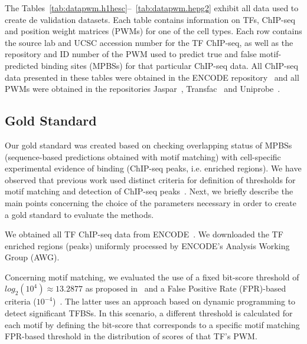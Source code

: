\documentclass{bioinfo}
\begin{document}
The Tables~\ref{tab:datapwm.h1hesc}--~\ref{tab:datapwm.hepg2} exhibit all
data used to create de validation datasets. Each table contains information
on TFs, ChIP-seq and position weight matrices (PWMs) for one of the cell types. Each
row contains the source lab and UCSC accession number for the TF ChIP-seq, as well
as the repository and ID number of the PWM used to predict true and false
motif-predicted binding sites (MPBSs) for that particular ChIP-seq data. All
ChIP-seq data presented in these tables were obtained in the ENCODE
repository~\citep{encode2012} and all PWMs were obtained in the repositories
Jaspar~\citep{mathelier2014}, Transfac~\citep{matys2006} and Uniprobe~\citep{robasky2011}.

\subsection{Gold Standard}
\label{sec:tfbs.reduction}

Our gold standard was created based on checking overlapping status
of MPBSs (sequence-based predictions obtained with motif matching)
with cell-specific experimental evidence of binding (ChIP-seq peaks,
i.e. enriched regions). We have observed that previous work used distinct
criteria for definition of thresholds for motif matching and detection of
ChIP-seq peaks~\citep{pique2011,boyle2011,cuellar2012,whitington2009}.
Next, we briefly describe the main points concerning the choice of the
parameters necessary in order to create a gold standard to evaluate the methods.

We obtained all TF ChIP-seq data from ENCODE~\citep{encode2012}. We downloaded
the TF enriched regions (peaks) uniformly processed by ENCODE's Analysis Working
Group (AWG).

Concerning motif matching, we evaluated the use of a fixed bit-score
threshold of $ log_2(10^4) \approx 13.2877 $ as proposed in~\cite{pique2011}
and a False Positive Rate (FPR)-based criteria ($10^{-4}$)~\citep{wilczynski2009}.
The latter uses an approach based on dynamic programming to detect
significant TFBSs. In this scenario, a different threshold
is calculated for each motif by defining the bit-score that corresponds
to a specific motif matching FPR-based threshold in the distribution of
scores of that TF's PWM.
\end{document}
